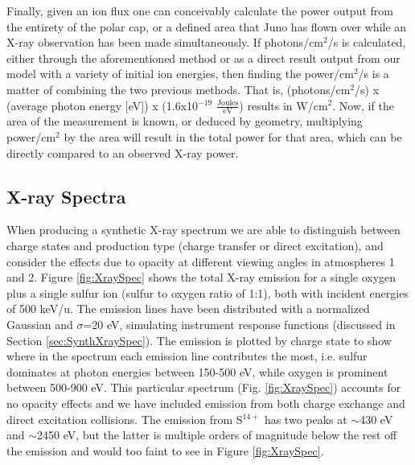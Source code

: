 \documentclass[draft]{agujournal2018}
\begin{document}
Finally, given an ion flux one can conceivably calculate the power output from the entirety of the polar cap, or a defined area that Juno has flown over while an X-ray observation has been made simultaneously.
If photons/cm$^2$/s is calculated, either through the aforementioned method or as a direct result output from our model with a variety of initial ion energies, then finding the power/cm$^2$/s is a matter of combining the two  previous methods.
That is, (photons/cm$^2$/s) x (average photon energy [eV]) x (1.6x10$^{-19}$ $\frac{\mathrm{Joules}}{\mathrm{eV}}$) results in W/cm$^2$.
Now, if the area of the measurement is known, or deduced by geometry, multiplying power/cm$^2$ by the area will result in the total power for that area, which can be directly compared to an observed X-ray power.

\subsection{X-ray Spectra}
\label{sec:XraySpec}

When producing a synthetic X-ray spectrum we are able to distinguish between charge states and production type (charge transfer or direct excitation), and consider the effects due to opacity at different viewing angles in atmospheres 1 and 2.
Figure \ref{fig:XraySpec} shows the total X-ray emission for a single oxygen plus a single sulfur ion (sulfur to oxygen ratio of 1:1), both with incident energies of 500 keV/u.
The emission lines have been distributed with a normalized Gaussian and $\sigma$=20 eV, simulating instrument response functions (discussed in Section \ref{sec:SynthXraySpec}).
The emission is plotted by charge state to show where in the spectrum each emission line contributes the most, i.e. sulfur dominates at photon energies between 150-500 eV, while oxygen is prominent between 500-900 eV.
This particular spectrum (Fig. \ref{fig:XraySpec}) accounts for no opacity effects and we have included emission from both charge exchange and direct excitation collisions.
The emission from S$^{14+}$ has two peaks at $\sim$430 eV and $\sim$2450 eV, but the latter is multiple orders of magnitude below the rest off the emission and would too faint to see in Figure \ref{fig:XraySpec}.
\end{document}
